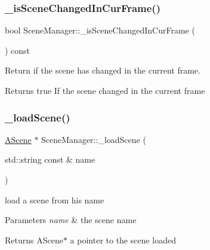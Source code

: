 \subsubsection{\texorpdfstring{\+\_\+is\+Scene\+Changed\+In\+Cur\+Frame()}{\_isSceneChangedInCurFrame()}}
{\footnotesize\ttfamily bool Scene\+Manager\+::\+\_\+is\+Scene\+Changed\+In\+Cur\+Frame (\begin{DoxyParamCaption}{ }\end{DoxyParamCaption}) const\hspace{0.3cm}{\ttfamily [protected]}}



Return if the scene has changed in the current frame. 

\begin{DoxyReturn}{Returns}
true If the scene changed in the current frame 
\end{DoxyReturn}
\mbox{\label{class_scene_manager_a9209f024c89479aab57bf3277c86a584}} 
\subsubsection{\texorpdfstring{\+\_\+load\+Scene()}{\_loadScene()}}
{\footnotesize\ttfamily \hyperlink{class_a_scene}{A\+Scene} $\ast$ Scene\+Manager\+::\+\_\+load\+Scene (\begin{DoxyParamCaption}\item[{std\+::string const \&}]{name }\end{DoxyParamCaption})\hspace{0.3cm}{\ttfamily [protected]}}



load a scene from his name 


\begin{DoxyParams}{Parameters}
{\em name} & the scene name \\
\hline
\end{DoxyParams}
\begin{DoxyReturn}{Returns}
A\+Scene$\ast$ a pointer to the scene loaded 
\end{DoxyReturn}
\mbox{\label{class_scene_manager_acae2f12e491a06191c50e0459b00b910}} 
